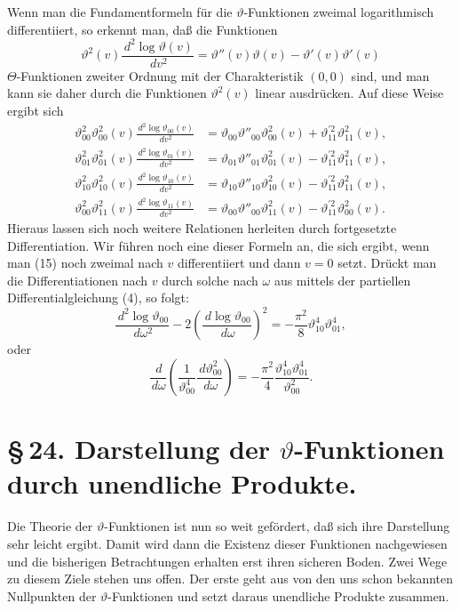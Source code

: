\documentclass[11pt]{article}
\providecommand{\dd}{\,d}
\providecommand{\tht}{\vartheta}
\begin{document}
Wenn man die Fundamentformeln für die $\vartheta$-Funktionen zweimal logarithmisch differentiiert, so erkennt man, daß die Funktionen
\[
\tht^2(v)\frac{\dd^2\log\tht(v)}{\dd v^2}
=\tht''(v)\tht(v)-\tht'(v)\tht'(v)
\]
$\Theta$-Funktionen zweiter Ordnung mit der Charakteristik $(0,0)$ sind, und man kann sie daher durch die Funktionen $\tht^2(v)$ linear ausdrücken. Auf diese Weise ergibt sich
\begin{align}
\tht_{00}^{2}\tht_{00}^{2}(v)\frac{\dd^2\log\tht_{00}(v)}{\dd v^2}
&=\tht_{00}\tht''_{00}\tht_{00}^{2}(v)+\tht_{11}^{\prime 2}\tht_{11}^{2}(v), \tag{15}\\
\tht_{01}^{2}\tht_{01}^{2}(v)\frac{\dd^2\log\tht_{01}(v)}{\dd v^2}
&=\tht_{01}\tht''_{01}\tht_{01}^{2}(v)-\tht_{11}^{\prime 2}\tht_{11}^{2}(v), \tag{16}\\
\tht_{10}^{2}\tht_{10}^{2}(v)\frac{\dd^2\log\tht_{10}(v)}{\dd v^2}
&=\tht_{10}\tht''_{10}\tht_{10}^{2}(v)-\tht_{11}^{\prime 2}\tht_{11}^{2}(v), \tag{17}\\
\tht_{00}^{2}\tht_{11}^{2}(v)\frac{\dd^2\log\tht_{11}(v)}{\dd v^2}
&=\tht_{00}\tht''_{00}\tht_{11}^{2}(v)-\tht_{11}^{\prime 2}\tht_{00}^{2}(v). \tag{18}
\end{align}
Hieraus lassen sich noch weitere Relationen herleiten durch fortgesetzte Differentiation. Wir führen noch eine dieser Formeln an, die sich ergibt, wenn man (15) noch zweimal nach $v$ differentiiert und dann $v=0$ setzt. Drückt man die Differentiationen nach $v$ durch solche nach $\omega$ aus mittels der partiellen Differentialgleichung (4), so folgt:
\[
\frac{\dd^2\log\tht_{00}}{\dd\omega^2}-2\left(\frac{\dd\log\tht_{00}}{\dd\omega}\right)^2
=-\frac{\pi^2}{8}\tht_{10}^{4}\tht_{01}^{4},
\]
oder
\begin{equation}
\frac{\dd}{\dd\omega}\left(\frac{1}{\tht_{00}^{4}}\frac{\dd\tht_{00}^{2}}{\dd\omega}\right)
=-\frac{\pi^2}{4}\frac{\tht_{10}^{4}\tht_{01}^{4}}{\tht_{00}^{2}}.
\tag{19}
\end{equation}

\section*{\S\,24. Darstellung der $\vartheta$-Funktionen durch unendliche Produkte.}

Die Theorie der $\vartheta$-Funktionen ist nun so weit gefördert, daß sich ihre Darstellung sehr leicht ergibt. Damit wird dann die Existenz dieser Funktionen nachgewiesen und die bisherigen Betrachtungen erhalten erst ihren sicheren Boden. Zwei Wege zu diesem Ziele stehen uns offen. Der erste geht aus von den uns schon bekannten Nullpunkten der $\vartheta$-Funktionen und setzt daraus unendliche Produkte zusammen.
\end{document}
